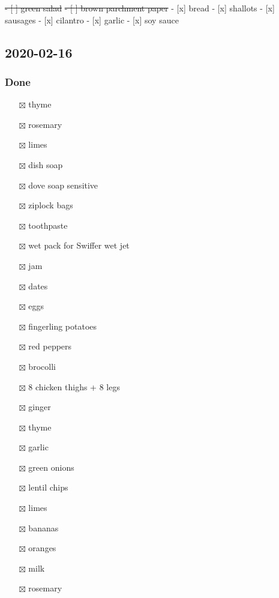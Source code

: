 \documentclass[
]{article}
\providecommand{\tightlist}{%
  \setlength{\itemsep}{0pt}\setlength{\parskip}{0pt}}
\begin{document}
\sout{- {[} {]} green salad}
\sout{- {[} {]} brown parchment paper}
- {[}x{]} bread
- {[}x{]} shallots
- {[}x{]} sausages
- {[}x{]} cilantro
- {[}x{]} garlic
- {[}x{]} soy sauce

\hypertarget{section-1}{%
\subsection{2020-02-16}\label{section-1}}

\hypertarget{done-1}{%
\subsubsection{Done}\label{done-1}}

\begin{itemize}
\tightlist
\item[$\boxtimes$]
  thyme
\item[$\boxtimes$]
  rosemary
\item[$\boxtimes$]
  limes
\item[$\boxtimes$]
  dish soap
\item[$\boxtimes$]
  dove soap sensitive
\item[$\boxtimes$]
  ziplock bags
\item[$\boxtimes$]
  toothpaste
\item[$\boxtimes$]
  wet pack for Swiffer wet jet
\item[$\boxtimes$]
  jam
\item[$\boxtimes$]
  dates
\item[$\boxtimes$]
  eggs
\item[$\boxtimes$]
  fingerling potatoes
\item[$\boxtimes$]
  red peppers
\item[$\boxtimes$]
  brocolli
\item[$\boxtimes$]
  8 chicken thighs + 8 legs
\item[$\boxtimes$]
  ginger
\item[$\boxtimes$]
  thyme
\item[$\boxtimes$]
  garlic
\item[$\boxtimes$]
  green onions
\item[$\boxtimes$]
  lentil chips
\item[$\boxtimes$]
  limes
\item[$\boxtimes$]
  bananas
\item[$\boxtimes$]
  oranges
\item[$\boxtimes$]
  milk
\item[$\boxtimes$]
  rosemary

\end{itemize}
\end{document}

